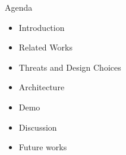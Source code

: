 \begin{frame}{Agenda}
    \begin{itemize}
        \item Introduction
        \item Related Works
        \item Threats and Design Choices
        \item Architecture
        \item Demo
        \item Discussion
        \item Future works
    \end{itemize}
\end{frame}
